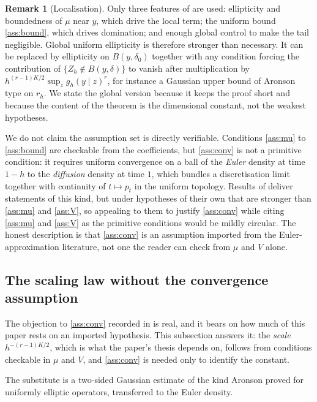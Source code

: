 \documentclass[11pt]{article}
\theoremstyle{definition}
\newtheorem{remark}[remark]{Remark}
\begin{document}
\begin{remark}[Localisation]\label{rem:localisation}
Only three features of  are used: ellipticity and boundedness of $\mu$ near $y$, which drive the local term; the uniform bound \ref{ass:bound}, which drives domination; and enough global control to make the tail negligible. Global uniform ellipticity is therefore stronger than necessary. It can be replaced by ellipticity on $B(y,\delta_0)$ together with any condition forcing the contribution of $\{Z_h\notin B(y,\delta)\}$ to vanish after multiplication by $h^{(r-1)K/2}\sup_zg_h(y\mid z)^r$, for instance a Gaussian upper bound of Aronson type on $r_h$. We state the global version because it keeps the proof short and because the content of the theorem is the dimensional constant, not the weakest hypotheses.

We do not claim the assumption set is directly verifiable. Conditions \ref{ass:mu} to \ref{ass:bound} are checkable from the coefficients, but \ref{ass:conv} is not a primitive condition: it requires uniform convergence on a ball of the \emph{Euler} density at time $1-h$ to the \emph{diffusion} density at time $1$, which bundles a discretisation limit together with continuity of $t\mapsto p_t$ in the uniform topology. Results of \citet{BallyTalay1996a,BallyTalay1996b} deliver statements of this kind, but under hypotheses of their own that are stronger than \ref{ass:mu} and \ref{ass:V}, so appealing to them to justify \ref{ass:conv} while citing \ref{ass:mu} and \ref{ass:V} as the primitive conditions would be mildly circular. The honest description is that \ref{ass:conv} is an assumption imported from the Euler-approximation literature, not one the reader can check from $\mu$ and $V$ alone.
\end{remark}

\subsection{The scaling law without the convergence assumption}\label{sec:aronson}

The objection to \ref{ass:conv} recorded in  is real, and it bears on how much of this paper rests on an imported hypothesis. This subsection answers it: the \emph{scale} $h^{-(r-1)K/2}$, which is what the paper's thesis depends on, follows from conditions checkable in $\mu$ and $V$, and \ref{ass:conv} is needed only to identify the constant.

The substitute is a two-sided Gaussian estimate of the kind Aronson proved for uniformly elliptic operators, transferred to the Euler density.
\end{document}
